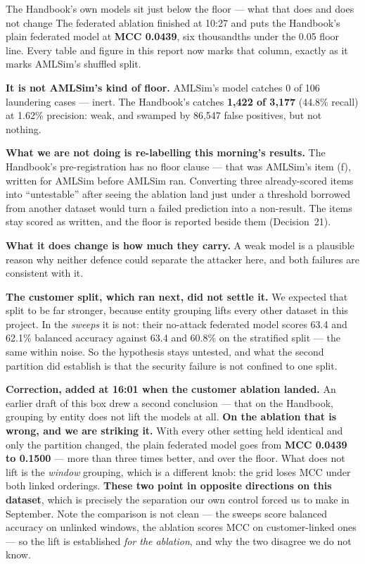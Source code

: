 \documentclass[11pt]{article}
\begin{document}
\begin{warnbox}{The Handbook's own models sit just below the floor --- what that does and does not change}
The federated ablation finished at 10:27 and puts the Handbook's plain federated model at \textbf{MCC
0.0439}, six thousandths under the 0.05 floor line. Every table and figure in this report now marks that
column, exactly as it marks AMLSim's shuffled split.

\textbf{It is not AMLSim's kind of floor.} AMLSim's model catches 0 of 106 laundering cases --- inert. The
Handbook's catches \textbf{1{,}422 of 3{,}177} (44.8\% recall) at 1.62\% precision: weak, and swamped by
86{,}547 false positives, but not nothing.

\textbf{What we are not doing is re-labelling this morning's results.} The Handbook's pre-registration has
no floor clause --- that was AMLSim's item (f), written for AMLSim before AMLSim ran. Converting three
already-scored items into ``untestable'' after seeing the ablation land just under a threshold borrowed
from another dataset would turn a failed prediction into a non-result. The items stay scored as written,
and the floor is reported beside them (Decision~21).

\textbf{What it does change is how much they carry.} A weak model is a plausible reason why neither
defence could separate the attacker here, and both failures are consistent with it.

\textbf{The customer split, which ran next, did not settle it.} We expected that split to be far stronger,
because entity grouping lifts every other dataset in this project. In the \emph{sweeps} it is not: their
no-attack federated model scores 63.4 and 62.1\% balanced accuracy against 63.4 and 60.8\% on the
stratified split --- the same within noise. So the hypothesis stays untested, and what the second
partition did establish is that the security failure is not confined to one split.

\textbf{Correction, added at 16:01 when the customer ablation landed.} An earlier draft of this box drew a
second conclusion --- that on the Handbook, grouping by entity does not lift the models at all. \textbf{On
the ablation that is wrong, and we are striking it.} With every other setting held identical and only the
partition changed, the plain federated model goes from \textbf{MCC 0.0439 to 0.1500} --- more than three
times better, and over the floor. What does not lift is the \emph{window} grouping, which is a different
knob: the grid loses MCC under both linked orderings. \textbf{These two point in opposite directions on
this dataset}, which is precisely the separation our own control forced us to make in September. Note the
comparison is not clean --- the sweeps score balanced accuracy on unlinked windows, the ablation scores
MCC on customer-linked ones --- so the lift is established \emph{for the ablation}, and why the two
disagree we do not know.
\end{warnbox}
\end{document}
